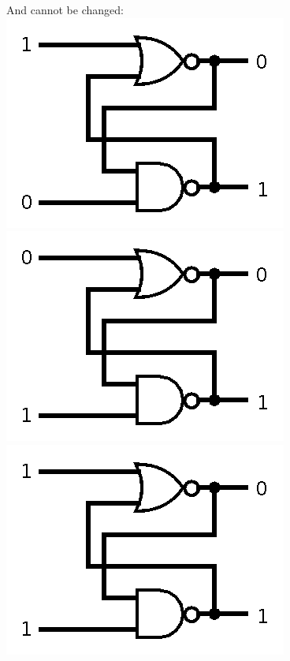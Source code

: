 \documentclass{article}
\begin{document}
\begin{itemize}
	And cannot be changed:\\
	\includegraphics[scale=0.5]{hw4-3b}\\
	\includegraphics[scale=0.5]{hw4-3c}\\
	\includegraphics[scale=0.5]{hw4-3d}


\end{itemize}
\end{document}
